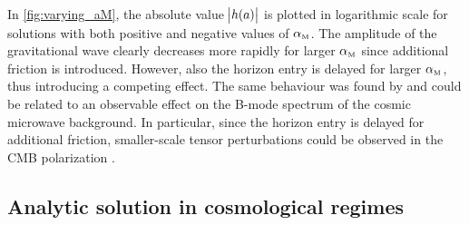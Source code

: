 \documentclass[12pt,parskip=half]{scrreprt}
\begin{document}

In \autoref{fig:varying_aM}, the absolute value \(\abs{h(a)}\) is plotted in logarithmic scale for solutions with both positive and negative values of \({\alpha_{\textnormal{\tiny{M}}}}\). The amplitude of the gravitational wave clearly decreases more rapidly for larger \({\alpha_{\textnormal{\tiny{M}}}}\) since additional friction is introduced. However, also the horizon entry is delayed for larger \({\alpha_{\textnormal{\tiny{M}}}}\), thus introducing a competing effect. The same behaviour was found by \textcite{Pettorino2014} and could be related to an observable effect on the B-mode spectrum of the cosmic microwave background. In particular, since the horizon entry is delayed for additional friction, smaller-scale tensor perturbations could be observed in the CMB polarization \autocite{Pettorino2014}.


\subsection{Analytic solution in cosmological regimes}
\end{document}
